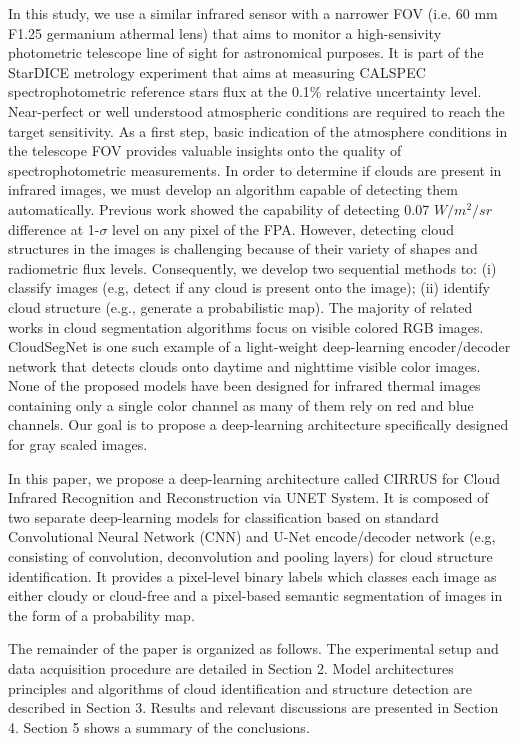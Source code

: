 \documentclass[remotesensing,article,submit,pdftex,moreauthors]{Definitions/mdpi}
\begin{document}
In this study, we use a similar infrared sensor with a narrower FOV (i.e. 60 mm F1.25 germanium athermal lens) that aims to monitor a high-sensivity photometric telescope line of sight for astronomical purposes. It is part of the StarDICE metrology experiment that aims at measuring CALSPEC spectrophotometric reference stars flux at the 0.1\% relative uncertainty level. Near-perfect or well understood atmospheric conditions are required to reach the target sensitivity. As a first step, basic indication of the atmosphere conditions in the telescope FOV provides valuable insights onto the quality of spectrophotometric measurements. In order to determine if clouds are present in infrared images, we must develop an algorithm capable of detecting them automatically. Previous work showed the capability of detecting 0.07 $W/m^{2}/sr$ difference at 1-$\sigma$ level on any pixel of the FPA. However, detecting cloud structures in the images is challenging because of their variety of shapes and radiometric flux levels. Consequently, we develop two sequential methods to: (i) classify images (e.g, detect if any cloud is present onto the image); (ii) identify cloud structure (e.g., generate a probabilistic map). The majority of related works in cloud segmentation algorithms focus on visible colored RGB images. CloudSegNet is one such example of a light-weight deep-learning encoder/decoder network that detects clouds onto daytime and nighttime visible color images. None of the proposed models have been designed for infrared thermal images containing only a single color channel as many of them rely on red and blue channels. Our goal is to propose a deep-learning architecture specifically designed for gray scaled images.

In this paper, we propose a deep-learning architecture called CIRRUS for Cloud Infrared Recognition and Reconstruction via UNET System. It is composed of two separate deep-learning models for classification based on standard Convolutional Neural Network (CNN) and U-Net encode/decoder network (e.g, consisting of convolution, deconvolution and pooling layers) for cloud structure identification. It provides a pixel-level binary labels which classes each image as either cloudy or cloud-free and a pixel-based semantic segmentation of images in the form of a probability map.

The remainder of the paper is organized as follows. The experimental setup and data acquisition procedure are detailed in Section 2. Model architectures principles and algorithms of cloud identification and structure detection are described in Section 3. Results and relevant discussions are presented in Section 4. Section 5 shows a summary of the conclusions.
\end{document}
